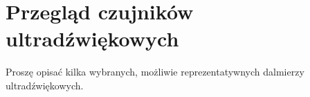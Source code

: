 \chapter[Przegląd czujników ultradźwiękowych]{Przegląd czujników ultradźwiękowych}

\label{przeglad_czujnikow}



Proszę opisać kilka wybranych, możliwie reprezentatywnych
dalmierzy ultradźwiękowych.


